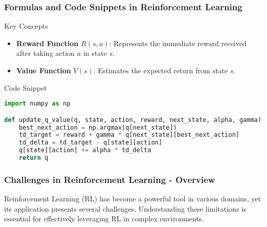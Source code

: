\documentclass[aspectratio=169]{beamer}
\begin{document}
\begin{frame}[fragile]
    \frametitle{Formulas and Code Snippets in Reinforcement Learning}

    \begin{block}{Key Concepts}
        \begin{itemize}
            \item \textbf{Reward Function} \( R(s, a) \): Represents the immediate reward received after taking action \( a \) in state \( s \).
            \item \textbf{Value Function} \( V(s) \): Estimates the expected return from state \( s \).
        \end{itemize}
    \end{block}

    \begin{block}{Code Snippet}
        \begin{lstlisting}[language=Python]
import numpy as np

def update_q_value(q, state, action, reward, next_state, alpha, gamma):
    best_next_action = np.argmax(q[next_state])
    td_target = reward + gamma * q[next_state][best_next_action]
    td_delta = td_target - q[state][action]
    q[state][action] += alpha * td_delta
    return q
        \end{lstlisting}
    \end{block}
\end{frame}

\begin{frame}[fragile]
  \frametitle{Challenges in Reinforcement Learning - Overview}
  Reinforcement Learning (RL) has become a powerful tool in various domains, yet its application presents several challenges. Understanding these limitations is essential for effectively leveraging RL in complex environments.
\end{frame}
\end{document}
